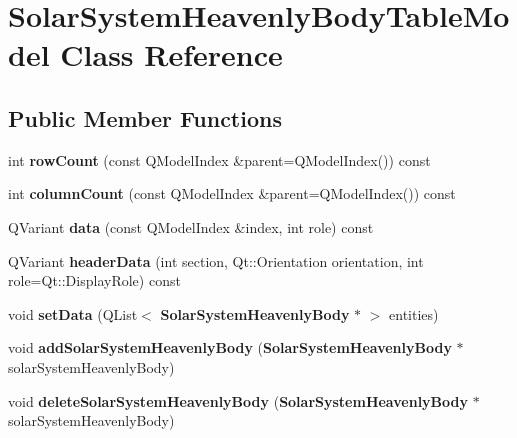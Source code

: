 \section{\-Solar\-System\-Heavenly\-Body\-Table\-Model \-Class \-Reference}
\label{da/d05/classSolarSystemHeavenlyBodyTableModel}
\subsection*{\-Public \-Member \-Functions}
\begin{DoxyCompactItemize}
\item 
int {\bfseries row\-Count} (const \-Q\-Model\-Index \&parent=\-Q\-Model\-Index()) const \label{da/d05/classSolarSystemHeavenlyBodyTableModel_abc6d37ab7e0df254fb3c6048ca283ac6}

\item 
int {\bfseries column\-Count} (const \-Q\-Model\-Index \&parent=\-Q\-Model\-Index()) const \label{da/d05/classSolarSystemHeavenlyBodyTableModel_a65a7aa0fce7e30ff7e9ba06c2fed85fd}

\item 
\-Q\-Variant {\bfseries data} (const \-Q\-Model\-Index \&index, int role) const \label{da/d05/classSolarSystemHeavenlyBodyTableModel_ae43dcd5109db06fc7515fef09c9a0cfe}

\item 
\-Q\-Variant {\bfseries header\-Data} (int section, \-Qt\-::\-Orientation orientation, int role=\-Qt\-::\-Display\-Role) const \label{da/d05/classSolarSystemHeavenlyBodyTableModel_a6794ee9665ef7c8ac88209791ca8c891}

\item 
void {\bfseries set\-Data} (\-Q\-List$<$ {\bf \-Solar\-System\-Heavenly\-Body} $\ast$ $>$ entities)\label{da/d05/classSolarSystemHeavenlyBodyTableModel_a5b3c766d6fc43ac20de2e7a74c5b0a83}

\item 
void {\bfseries add\-Solar\-System\-Heavenly\-Body} ({\bf \-Solar\-System\-Heavenly\-Body} $\ast$solar\-System\-Heavenly\-Body)\label{da/d05/classSolarSystemHeavenlyBodyTableModel_afd23f1ec90ad4a6a287c42a709b108e2}

\item 
void {\bfseries delete\-Solar\-System\-Heavenly\-Body} ({\bf \-Solar\-System\-Heavenly\-Body} $\ast$solar\-System\-Heavenly\-Body)\label{da/d05/classSolarSystemHeavenlyBodyTableModel_aa9d98386e9a50e133f9bee7853aa0465}


\end{DoxyCompactItemize}
